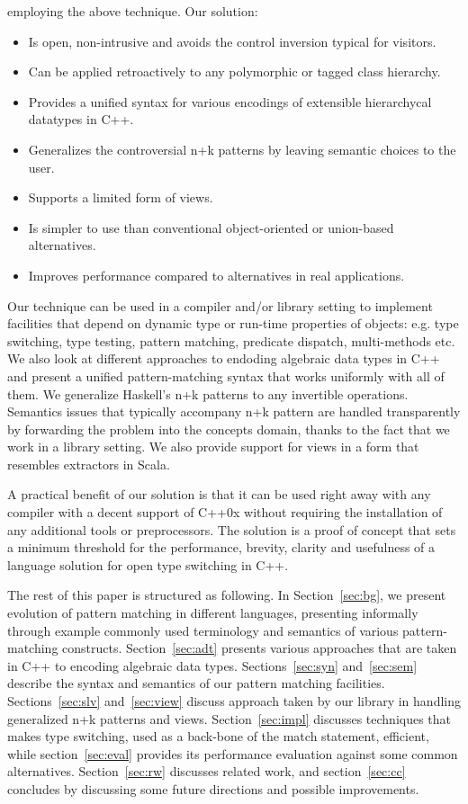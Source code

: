 \begin{itemize}
      employing the above technique. Our solution:
  \begin{itemize}
  \item Is open, non-intrusive and avoids the control inversion typical for visitors.
  \item Can be applied retroactively to any polymorphic or tagged class hierarchy.
  \item Provides a unified syntax for various encodings of extensible 
        hierarchycal datatypes in C++.
  \item Generalizes the controversial n+k patterns by leaving semantic choices to the user.
  \item Supports a limited form of views.
  \item Is simpler to use than conventional object-oriented or union-based alternatives.
  \item Improves performance compared to alternatives in real applications.
  \end{itemize}
\end{itemize}

\noindent
Our technique can be used in a compiler and/or library setting to implement 
facilities that depend on dynamic type or run-time properties of objects: e.g. 
type switching, type testing, pattern matching, predicate dispatch, 
multi-methods etc. We also look at different approaches to endoding algebraic 
data types in C++ and present a unified pattern-matching syntax that works 
uniformly with all of them. 
We generalize Haskell's n+k patterns\cite{haskell98} to any invertible operations. 
Semantics issues that typically accompany n+k pattern are handled transparently 
by forwarding the problem into the concepts domain, thanks to the fact that we 
work in a library setting. We also provide support for views in a form that 
resembles extractors in Scala. 

A practical benefit of our solution is that it can be used right away with any 
compiler with a decent support of C++0x without requiring the installation of 
any additional tools or preprocessors. The solution is a proof of concept that 
sets a minimum threshold for the performance, brevity, clarity and usefulness of 
a language solution for open type switching in C++.

The rest of this paper is structured as following. In Section~\ref{sec:bg}, we 
present evolution of pattern matching in different languages, presenting 
informally through example commonly used terminology and semantics of various 
pattern-matching constructs. Section~\ref{sec:adt} presents various approaches 
that are taken in C++ to encoding algebraic data types.
Sections~\ref{sec:syn} and~\ref{sec:sem} describe the syntax and semantics of 
our pattern matching facilities. Sections~\ref{sec:slv} and~\ref{sec:view} discuss 
approach taken by our library in handling generalized n+k patterns and views. 
Section~\ref{sec:impl} discusses techniques that makes type switching, used as a 
back-bone of the match statement, efficient, while section~\ref{sec:eval} 
provides its performance evaluation against some common alternatives. 
Section~\ref{sec:rw} discusses related work, and section~\ref{sec:cc} concludes 
by discussing some future directions and possible improvements.

